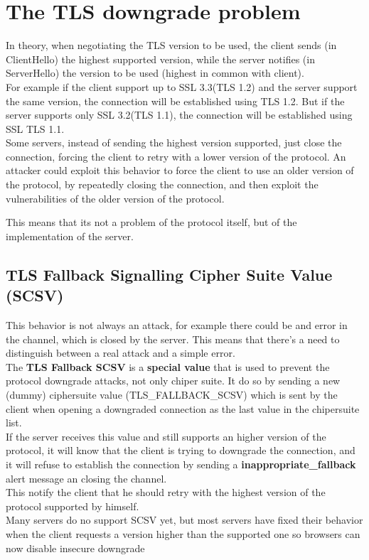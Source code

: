 \section{The TLS downgrade problem}
In theory, when negotiating the TLS version to be used, the client
sends (in ClientHello) the highest supported version, while the server
notifies (in ServerHello) the version to be used (highest in common
with client).\\
For example if the client support up to SSL 3.3(TLS 1.2) and the
server support the same version, the connection will be established
using TLS 1.2. But if the server supports only SSL 3.2(TLS 1.1), the
connection will be established using SSL TLS 1.1.\\
Some servers, instead of sending the highest version supported, just
close the connection, forcing the client to retry with a lower version
of the protocol. An attacker could exploit this behavior to force the
client to use an older version of the protocol, by repeatedly closing
the connection, and then exploit the vulnerabilities of the older
version of the protocol.
\begin{boxH}
  This means that its not a problem of the protocol itself, but of the
  implementation of the server.
\end{boxH}

\subsection{TLS Fallback Signalling Cipher Suite Value (SCSV)}
This behavior is not always an attack, for example there could be and
error in the channel, which is closed by the server. This means that
there's a need to distinguish between a real attack and a simple 
error.\\
The \textbf{TLS Fallback SCSV} is a \textbf{special value} that is
used to prevent the protocol downgrade attacks, not only chiper suite.
It do so by sending a new (dummy) ciphersuite
value (TLS\_FALLBACK\_SCSV) which is sent by the client when opening a
downgraded connection as the last value in the chipersuite list.\\
If the server receives this value and still supports an higher version
of the protocol, it will know that the client is trying to downgrade
the connection, and it will refuse to establish the connection by
sending a \textbf{inappropriate\_fallback} alert message an closing
the channel.\\
This notify the client that he should retry with the highest version 
of the protocol supported by himself.\\
Many servers do no support SCSV yet, but most servers have fixed their
behavior when the client requests a version higher than the supported
one so browsers can now disable insecure downgrade

